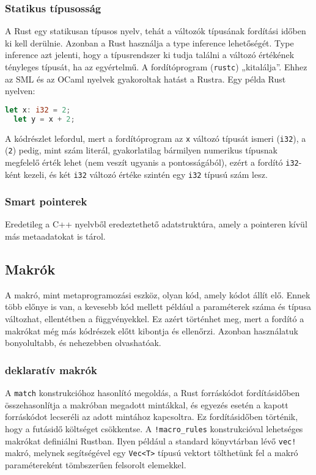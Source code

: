 \subsubsection{Statikus típusosság}
A Rust egy statikusan típusos nyelv, tehát a változók típusának fordítási időben ki kell derülnie. Azonban a Rust használja a type inference lehetőségét. Type inference azt jelenti, hogy a típusrendszer ki tudja találni a változó értékének tényleges típusát, ha az egyértelmű. A fordítóprogram (\lstinline{rustc}) „kitalálja”. Ehhez az SML és az OCaml nyelvek gyakoroltak hatást a Rustra. Egy példa Rust nyelven:
\begin{lstlisting}[language=Rust, style=boxed]
  let x: i32 = 2;
  let y = x + 2;
\end{lstlisting}
A kódrészlet lefordul, mert a fordítóprogram az \lstinline{x} változó típusát ismeri (\lstinline{i32}), a (\lstinline{2}) pedig, mint szám literál, gyakorlatilag bármilyen numerikus típusnak megfelelő érték lehet (nem veszít ugyanis a pontosságából), ezért a fordító \lstinline{i32}-ként kezeli, és két \lstinline{i32} változó értéke szintén egy \lstinline{i32} típusú szám lesz.

\subsubsection{Smart pointerek}
Eredetileg a C++ nyelvből eredeztethető adatstruktúra, amely a pointeren kívül más metaadatokat is tárol.

\subsection{Makrók}
A makró, mint metaprogramozási eszköz, olyan kód, amely kódot állít elő. Ennek több előnye is van, a kevesebb kód mellett például a paraméterek száma és típusa változhat, ellentétben a függvényekkel. Ez azért történhet meg, mert a fordító a makrókat még más kódrészek előtt kibontja és ellenőrzi. Azonban használatuk bonyolultabb, és nehezebben olvashatóak.

\subsubsection{deklaratív makrók}
A \lstinline{match} konstrukcióhoz hasonlító megoldás, a Rust forráskódot fordításidőben összehasonlítja a makróban megadott mintákkal, és egyezés esetén a kapott forráskódot lecseréli az adott mintához kapcsoltra. Ez fordításidőben történik, hogy a futásidő költséget csökkentse. A \lstinline{!macro_rules} konstrukcióval lehetséges makrókat definiálni Rustban. Ilyen például a standard könyvtárban lévő \lstinline{vec!} makró, melynek segítségével egy \lstinline{Vec<T>} típusú vektort tölthetünk fel a makró paramétereként tömbszerűen felsorolt elemekkel.

